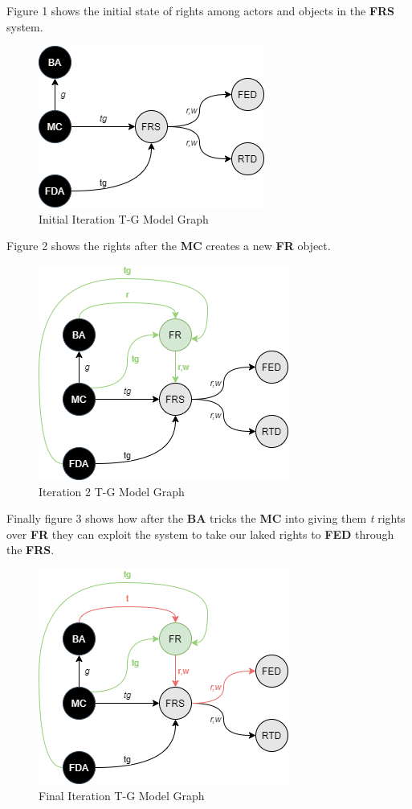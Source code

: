 \documentclass[10pt,journal,compsoc]{IEEEtran}
\begin{document}
  Figure 1 shows the initial state of rights among actors and objects in the \textbf{FRS} system.

  \begin{figure}[t]
    \caption{Initial Iteration T-G Model Graph} 
    \includegraphics[scale=0.7]{TGModel1.png}
  \end{figure}

  Figure 2 shows the rights after the \textbf{MC} creates a new \textbf{FR} object. 

  \begin{figure}[t]
    \caption{Iteration 2 T-G Model Graph} 
    \includegraphics[scale=0.7]{TGModel2.png}
  \end{figure}

  Finally figure 3 shows how after the \textbf{BA} tricks the \textbf{MC} into giving them \textit{t} rights over \textbf{FR} they can exploit the system to take our laked rights to \textbf{FED} through the \textbf{FRS}.

  \begin{figure}[t]
    \caption{Final Iteration T-G Model Graph} 
    \includegraphics[scale=0.7]{TGModel3.png}
  \end{figure}
\end{document}

